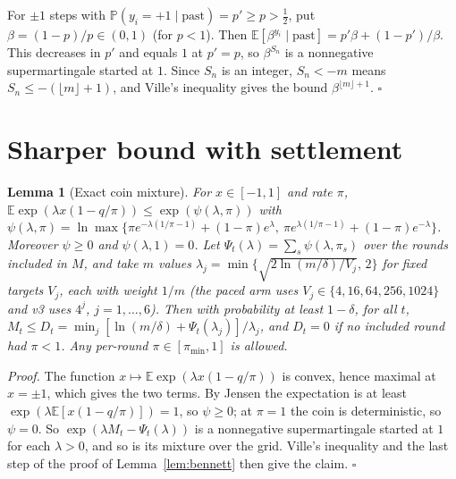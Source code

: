 \documentclass[10pt]{article}
\theoremstyle{plain}
\newtheorem{lemma}{Lemma}
\theoremstyle{definition}
\newcommand{\PP}{\mathbb{P}}
\newcommand{\E}{\mathbb{E}}
\begin{document}
For $\pm1$ steps with $\PP(y_i=+1\mid\text{past})=p'\ge p>\tfrac12$, put $\beta=(1-p)/p\in(0,1)$ (for $p<1$). Then $\E[\beta^{y_i}\mid\text{past}]=p'\beta+(1-p')/\beta$. This decreases in $p'$ and equals $1$ at $p'=p$, so $\beta^{S_n}$ is a nonnegative supermartingale started at $1$. Since $S_n$ is an integer, $S_n<-m$ means $S_n\le-(\lfloor m\rfloor+1)$, and Ville's inequality gives the bound $\beta^{\lfloor m\rfloor+1}$. $\square$

\begin{table}[!htbp]
\caption{Proposition~\ref{prop:price}: simulated forced-rollback frequency in the first deployment spell against the ruin bound (2{,}000 runs per cell); $z$ is the excess over the bound in binomial standard errors, zero when below. Positive bounds displayed as 0.0000 are rounded to four decimal places.}\label{tab:prop4}\centering\small
\end{table}
\FloatBarrier

\section{Sharper bound with settlement}\label{app:v2}
\begin{lemma}[Exact coin mixture]\label{lem:coin}
For $x\in[-1,1]$ and rate $\pi$, $\E\exp(\lambda x(1-q/\pi))\le\exp(\psi(\lambda,\pi))$ with $\psi(\lambda,\pi)=\ln\max\{\pi e^{-\lambda(1/\pi-1)}+(1-\pi)e^{\lambda},\ \pi e^{\lambda(1/\pi-1)}+(1-\pi)e^{-\lambda}\}$. Moreover $\psi\ge0$ and $\psi(\lambda,1)=0$. Let $\Psi_t(\lambda)=\sum_s\psi(\lambda,\pi_s)$ over the rounds included in $M$, and take $m$ values $\lambda_j=\min\{\sqrt{2\ln(m/\delta)/V_j},\,2\}$ for fixed targets $V_j$, each with weight $1/m$ (the paced arm uses $V_j\in\{4,16,64,256,1024\}$ and v3 uses $4^j$, $j=1,\dots,6$). Then with probability at least $1-\delta$, for all $t$, $M_t\le D_t=\min_j[\ln(m/\delta)+\Psi_t(\lambda_j)]/\lambda_j$, and $D_t=0$ if no included round had $\pi<1$. Any per-round $\pi\in[\pi_{\min},1]$ is allowed.
\end{lemma}
\emph{Proof.} The function $x\mapsto\E\exp(\lambda x(1-q/\pi))$ is convex, hence maximal at $x=\pm1$, which gives the two terms. By Jensen the expectation is at least $\exp(\lambda\E[x(1-q/\pi)])=1$, so $\psi\ge0$; at $\pi=1$ the coin is deterministic, so $\psi=0$. So $\exp(\lambda M_t-\Psi_t(\lambda))$ is a nonnegative supermartingale started at $1$ for each $\lambda>0$, and so is its mixture over the grid. Ville's inequality and the last step of the proof of Lemma~\ref{lem:bennett} then give the claim. $\square$
\end{document}
